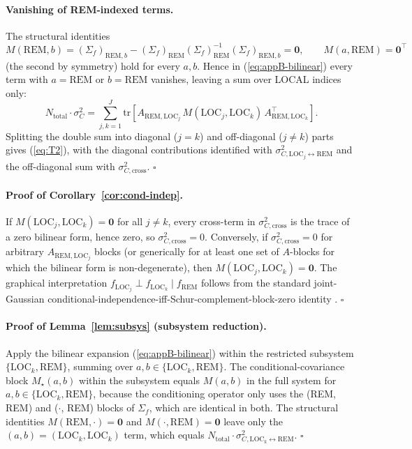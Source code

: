 \documentclass[11pt,letterpaper]{article}
\theoremstyle{remark}
\newcommand{\REM}{\mathrm{REM}}
\newcommand{\LOC}{\mathrm{LOC}}
\newcommand{\Sigmaf}{\Sigma_f}
\newcommand{\Ntot}{N_{\mathrm{total}}}
\newcommand{\sigC}{\sigma^2_C}
\newcommand{\trace}{\mathrm{tr}}
\begin{document}
\paragraph{Vanishing of REM-indexed terms.} The structural identities
\begin{equation*}
M(\REM, b) = (\Sigmaf)_{\REM, b} - (\Sigmaf)_\REM (\Sigmaf)_\REM^{-1} (\Sigmaf)_{\REM, b} = \mathbf{0}, \qquad M(a, \REM) = \mathbf{0}^\top
\end{equation*}
(the second by symmetry) hold for every $a, b$. Hence in (\ref{eq:appB-bilinear}) every term with $a = \REM$ or $b = \REM$ vanishes, leaving a sum over LOCAL indices only:
\begin{equation*}
\Ntot \cdot \sigC = \sum_{j, k = 1}^J \trace\!\left[A_{\REM, \LOC_j} \, M(\LOC_j, \LOC_k) \, A_{\REM, \LOC_k}^\top\right].
\end{equation*}
Splitting the double sum into diagonal ($j = k$) and off-diagonal ($j \ne k$) parts gives (\ref{eq:T2}), with the diagonal contributions identified with $\sigma^2_{C, \LOC_j \leftrightarrow \REM}$ and the off-diagonal sum with $\sigma^2_{C, \mathrm{cross}}$. $\square$

\paragraph{Proof of Corollary~\ref{cor:cond-indep}.} If $M(\LOC_j, \LOC_k) = \mathbf{0}$ for all $j \ne k$, every cross-term in $\sigma^2_{C, \mathrm{cross}}$ is the trace of a zero bilinear form, hence zero, so $\sigma^2_{C, \mathrm{cross}} = 0$. Conversely, if $\sigma^2_{C, \mathrm{cross}} = 0$ for arbitrary $A_{\REM, \LOC_j}$ blocks (or generically for at least one set of $A$-blocks for which the bilinear form is non-degenerate), then $M(\LOC_j, \LOC_k) = \mathbf{0}$. The graphical interpretation $f_{\LOC_j} \perp f_{\LOC_k} \mid f_\REM$ follows from the standard joint-Gaussian conditional-independence-iff-Schur-complement-block-zero identity \cite[\S 5.1.3, p.~129]{Lauritzen1996}. $\square$

\paragraph{Proof of Lemma~\ref{lem:subsys} (subsystem reduction).} Apply the bilinear expansion (\ref{eq:appB-bilinear}) within the restricted subsystem $\{\LOC_k, \REM\}$, summing over $a, b \in \{\LOC_k, \REM\}$. The conditional-covariance block $M_\star(a, b)$ within the subsystem equals $M(a, b)$ in the full system for $a, b \in \{\LOC_k, \REM\}$, because the conditioning operator only uses the (REM, REM) and ($\cdot$, REM) blocks of $\Sigmaf$, which are identical in both. The structural identities $M(\REM, \cdot) = \mathbf{0}$ and $M(\cdot, \REM) = \mathbf{0}$ leave only the $(a, b) = (\LOC_k, \LOC_k)$ term, which equals $\Ntot \cdot \sigma^2_{C, \LOC_k \leftrightarrow \REM}$. $\square$
\end{document}
